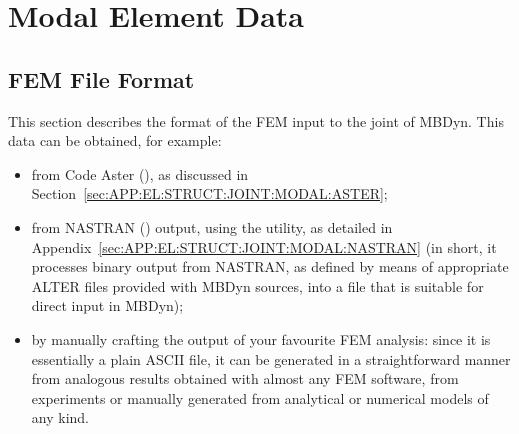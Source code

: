 %
%
%
%
%
% 
%
%

\chapter{Modal Element Data}

\section{FEM File Format}
\label{sec:APP:EL:STRUCT:JOINT:MODAL:FORMAT}

This section describes the format of the FEM input to the 
joint of MBDyn.
This data can be obtained, for example:
\begin{itemize}
\item from Code Aster
(),
as discussed in Section~\ref{sec:APP:EL:STRUCT:JOINT:MODAL:ASTER};
\item from NASTRAN
()
output, using the  utility,
as detailed in Appendix~\ref{sec:APP:EL:STRUCT:JOINT:MODAL:NASTRAN}
(in short, it processes binary output from NASTRAN, as defined by means
of appropriate ALTER files provided with MBDyn sources, into a file
that is suitable for direct input in MBDyn);
\item by manually crafting the output of your favourite FEM analysis:
since it is essentially a plain ASCII file, it can be generated
in a straightforward manner from analogous results obtained with
almost any FEM software, from experiments or manually generated
from analytical or numerical models of any kind.
\end{itemize}

